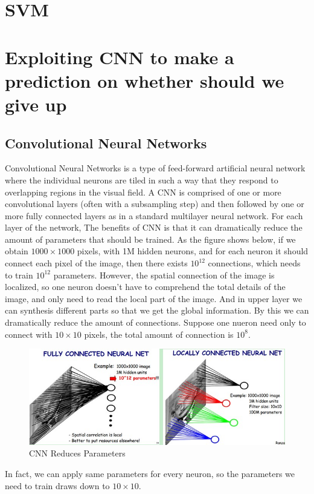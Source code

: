 \documentclass[a4paper, 11pt]{article} %
\begin{document}
\section{SVM}

\section{Exploiting CNN to make a prediction on whether should we give up}
\subsection{Convolutional Neural Networks}
Convolutional Neural Networks is a type of feed-forward artificial neural network where the individual neurons are tiled in such a way that they respond to overlapping regions in the visual field.\cite{CNN1} A CNN is comprised of one or more convolutional layers (often with a subsampling step) and then followed by one or more fully connected layers as in a standard multilayer neural network.\cite{CNN2} For each layer of the network, 
The benefits of CNN is that it can dramatically reduce the amount of parameters that should be trained. As the figure shows below, if we obtain $1000 \times 1000$ pixels, with 1M hidden neurons, and for each neuron it should connect each pixel of the image, then there exists $10^{12}$ connections, which needs to train $10^{12}$ parameters. However, the spatial connection of the image is localized, so one neuron doesn't have to comprehend the total details of the image, and only need to read the local part of the image. And in upper layer we can synthesis different parts so that we get the global information. By this we can dramatically reduce the amount of connections. Suppose one nueron need only to connect with $10 \times 10$ pixels, the total amount of connection is $10^8$.
\begin{figure}[h]
	\centering 
	\includegraphics[width=0.8\linewidth]{Figure2.jpg}
	\caption{CNN Reduces Parameters}
	\label{fig:subfig}
\end{figure}

In fact, we can apply same parameters for every neuron, so the parameters we need to train draws down to $10 \times 10$.
\end{document}
